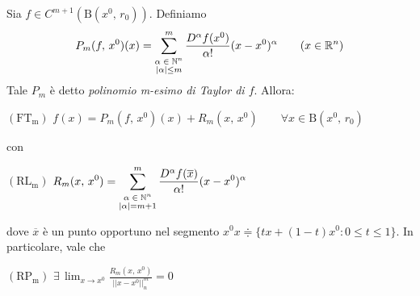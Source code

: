 \begin{thm}
Sia $f \in C^{m+1}(\mathrm{B}(x^0,\,r_0))$. Definiamo
$$
P_m(f,\,x^0)(x) = \sum_{\overset{\text{\scriptsize $\alpha \in \mathbb{N}^n$}}{|\alpha| \leq m}}^{m} \frac{D^{\alpha} f(x^0)}{\alpha!}(x-x^0)^{\alpha}
\qquad (x \in \mathbb{R}^n)
$$
Tale $P_m$ è detto \emph{polinomio m-esimo di Taylor di $f$}. Allora:
\begin{center}
$\mathrm{(FT_m)}$
\hfill
$\displaystyle f(x) = P_m(f,\,x^0)(x)+R_m(x,\,x^0) \qquad \forall x \in \mathrm{B}(x^0,\,r_0)$
\hfill \null \\
\end{center}
con
\begin{center}
$\mathrm{(RL_m)}$
\hfill
$\displaystyle R_m(x,\,x^0) = \sum_{\overset{\text{\scriptsize $\alpha \in \mathbb{N}^n$}}{|\alpha| = m+1}}^{m} \frac{D^{\alpha} f(\overline{x})}{\alpha!}(x-x^0)^{\alpha}$
\hfill \null \\
\end{center}
dove $\overline{x}$ è un punto opportuno nel segmento $x^0x \doteqdot \lbrace tx + (1-t)x^0 : 0 \leq t \leq 1 \rbrace$. In particolare, vale che
\begin{center}
$\mathrm{(RP_m)}$
\hfill
$\displaystyle \exists \, \lim_{x \rightarrow x^0} \frac{R_m(x,\,x^0)}{||x-x^0||_n^m} = 0$
\hfill \null \\
\end{center}
\end{thm}


